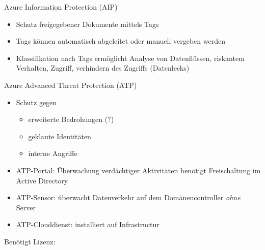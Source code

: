\begin{flashcard}[Definition]{Azure Information Protection (AIP)}
    \begin{itemize}
        \item Schutz freigegebener Dokumente mittels Tags
        \item Tags können automatisch abgeleitet oder manuell vergeben werden
        \item Klassifikation nach Tags ermöglicht Analyse von Datenflüssen, riskantem Verhalten, Zugriff, verhindern des Zugriffs (Datenlecks)
    \end{itemize}
\end{flashcard}

\begin{flashcard}[Describe]{Azure Advanced Threat Protection (ATP)}
    \begin{itemize}
        \item Schutz gegen 
        \begin{itemize}
            \item erweiterte Bedrohungen (?)
            \item geklaute Identitäten
            \item interne Angriffe
        \end{itemize}
        \item ATP-Portal: Überwachung verdächtiger Aktivitäten\newline
            benötigt Freischaltung im Active Directory
        \item ATP-Sensor: überwacht Datenverkehr auf dem Domänencontroller \emph{ohne} Server
        \item ATP-Clouddienst: installiert auf Infrastructur
    \end{itemize}
    Benötigt Lizenz:
\end{flashcard}
